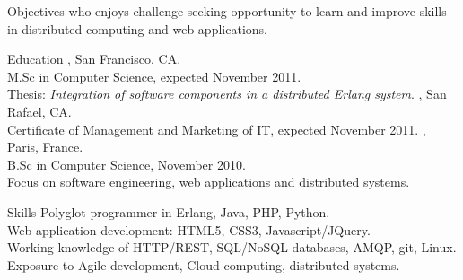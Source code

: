 \documentclass{resume}
\author{~~~~~~Edouard Swiac}
\begin{document}
\maketitle

\begin{category}{Objectives}
 who enjoys challenge seeking opportunity to learn and improve skills in distributed computing and web applications.
\end{category}


\begin{category}{Education}
, San Francisco, CA.
\\M.Sc in Computer Science, expected November 2011.
\\Thesis: \emph{Integration of software components in a distributed Erlang system}.
, San Rafael, CA.
\\Certificate of Management and Marketing of IT, expected November 2011.
, Paris, France.
\\B.Sc in Computer Science, November 2010.
\\Focus on software engineering, web applications and distributed systems.
\end{category}


\begin{category}{Skills}
\citemnobullet 
Polyglot programmer in Erlang, Java, PHP, Python.
\\Web application development: HTML5, CSS3, Javascript/JQuery.
\\Working knowledge of HTTP/REST, SQL/NoSQL databases, AMQP, git, Linux.
\\Exposure to Agile development, Cloud computing, distributed systems.
\end{category}
\end{document}
